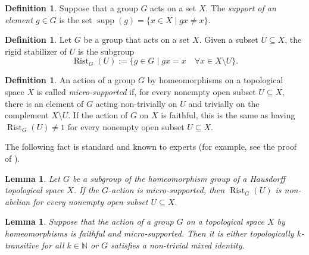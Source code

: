 \documentclass[11pt,letterpaper]{article}
\newcommand{\NN}{\mathbb{N}}
\DeclareMathOperator{\rist}{Rist}
\DeclareMathOperator{\supp}{supp}
\newtheorem{lem}[thm]{Lemma}
\theoremstyle{definition}
\newtheorem{defn}[thm]{Definition}
\theoremstyle{remark}
\begin{document}
\begin{defn}
Suppose that a group $G$ acts on a set $X$. The {\it support of an element $g \in G$} is the set $\supp(g)=\{ x \in X \mid gx \neq x \}$. 
\end{defn}

\begin{defn}
Let $G$ be a group that acts on a set $X$. Given a subset $U \subseteq X$, the rigid stabilizer of $U$ is the subgroup
$$
\rist_G(U):=\{g \in G \mid g x=x \quad \forall x \in X\setminus U\} .
$$
\end{defn}

\begin{defn}
An action of a group $G$ by homeomorphisms on a topological space $X$ is called {\it micro-supported} if, for every nonempty open subset $U \subseteq X$, there is an element of $G$ acting non-trivially on $U$ and trivially on the complement $X \setminus U$. If the action of $G$ on $X$ is faithful, this is the same as having $\rist_G(U) \neq 1$ for every nonempty open subset $U \subseteq X$.
\end{defn}

The following fact is standard and known to experts (for example, see the proof of \cite[Proposition H]{CRW}).

\begin{lem}\label{non-abelian rigid stabilizers}
Let $G$ be a subgroup of the homeomorphism group of a Hausdorff topological space $X$. If the $G$-action is micro-supported, then $\rist_G(U)$ is non-abelian for every nonempty open subset $U \subseteq X$.
\end{lem}


\begin{lem}\label{top.k-transitive or micro-supported}
Suppose that the action of a group $G$ on a topological space $X$ by homeomorphisms is faithful and micro-supported. Then it is either topologically $k$-transitive for all $k \in \NN$ or $G$ satisfies a non-trivial mixed identity.
\end{lem}
\end{document}
